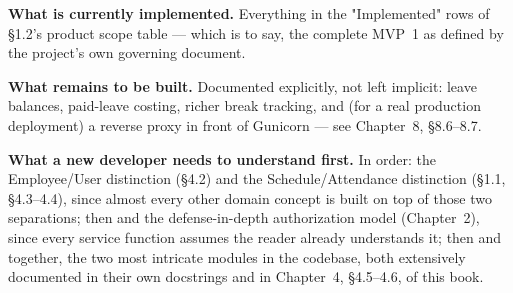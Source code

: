 \textbf{What is currently implemented.} Everything in the "Implemented"
rows of \S1.2's product scope table --- which is to say, the complete
MVP~1 as defined by the project's own governing document.

\textbf{What remains to be built.} Documented explicitly, not left
implicit: leave balances, paid-leave costing, richer break tracking,
and (for a real production deployment) a reverse proxy in front of
Gunicorn --- see Chapter~8, \S8.6--8.7.

\textbf{What a new developer needs to understand first.} In order: the
Employee/User distinction (\S4.2) and the Schedule/Attendance
distinction (\S1.1, \S4.3--4.4), since almost every other domain concept
is built on top of those two separations; then  and
the defense-in-depth authorization model (Chapter~2), since every
service function assumes the reader already understands it; then
 and  together, the
two most intricate modules in the codebase, both extensively documented
in their own docstrings and in Chapter~4, \S4.5--4.6, of this book.
